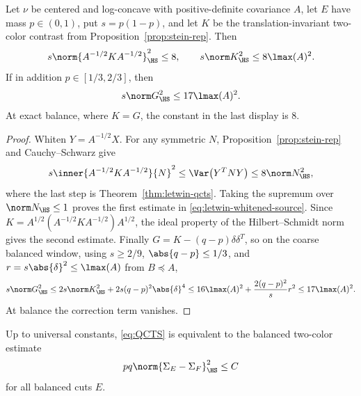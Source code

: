 \documentclass[../../main.tex]{subfiles}
\begin{document}
\begin{corollary}
\label{cor:qcts-source}
Let $\nu$ be centered and log-concave with positive-definite covariance $A$, let $E$ have mass
$p\in(0,1)$, put $s=p(1-p)$, and let $K$ be the translation-invariant two-color contrast from
Proposition~\ref{prop:stein-rep}. Then
\begin{equation}\label{eq:letwin-whitened-source}
  s\norm{A^{-1/2}KA^{-1/2}}_{\HS}^2\le8,
  \qquad
  s\norm K_{\HS}^2\le8\lmax(A)^2.
\end{equation}
If in addition $p\in[1/3,2/3]$, then
\begin{equation}\label{eq:letwin-euclidean-source}
  s\norm G_{\HS}^2\le17\lmax(A)^2.
\end{equation}
At exact balance, where $K=G$, the constant in the last display is $8$.
\end{corollary}

\begin{proof}
Whiten $Y=A^{-1/2}X$. For any symmetric $N$, Proposition~\ref{prop:stein-rep} and
Cauchy--Schwarz give
\[
  s\inner{A^{-1/2}KA^{-1/2}}{N}^2
  \le \Var\bigl(Y^TNY\bigr)
  \le 8\norm N_{\HS}^2,
\]
where the last step is Theorem~\ref{thm:letwin-qcts}. Taking the supremum over
$\norm N_{\HS}\le1$ proves the first estimate in \eqref{eq:letwin-whitened-source}. Since
$K=A^{1/2}(A^{-1/2}KA^{-1/2})A^{1/2}$, the ideal property of the Hilbert--Schmidt norm gives the
second estimate. Finally $G=K-(q-p)\delta\delta^T$, so on the coarse balanced window,
using $s\ge2/9$, $\abs{q-p}\le1/3$, and $r=s\abs{\delta}^2\le\lmax(A)$ from $B\preceq A$,
\[
  s\norm G_{\HS}^2
  \le2s\norm K_{\HS}^2+2s(q-p)^2\abs{\delta}^4
  \le16\lmax(A)^2+\frac{2(q-p)^2}{s}r^2
  \le17\lmax(A)^2.
\]
At balance the correction term vanishes.
\end{proof}

\begin{proposition}
\label{prop:qcts-equivalence}
Up to universal constants, \eqref{eq:QCTS} is equivalent to the balanced two-color estimate
\begin{equation}\label{eq:balanced-two-color-static}
  pq\norm{\Sigma_E-\Sigma_F}_{\HS}^2\le C
\end{equation}
for all balanced cuts $E$.
\end{proposition}
\end{document}
